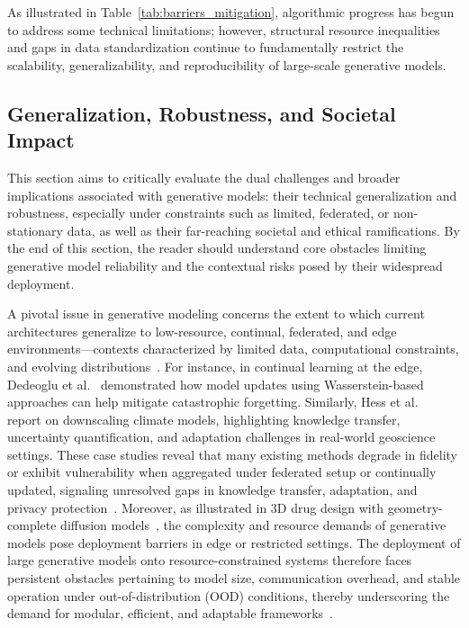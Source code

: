 \documentclass[sigconf]{acmart}
\begin{document}
As illustrated in Table~\ref{tab:barriers_mitigation}, algorithmic progress has begun to address some technical limitations; however, structural resource inequalities and gaps in data standardization continue to fundamentally restrict the scalability, generalizability, and reproducibility of large-scale generative models.

\subsection{Generalization, Robustness, and Societal Impact}

This section aims to critically evaluate the dual challenges and broader implications associated with generative models: their technical generalization and robustness, especially under constraints such as limited, federated, or non-stationary data, as well as their far-reaching societal and ethical ramifications. By the end of this section, the reader should understand core obstacles limiting generative model reliability and the contextual risks posed by their widespread deployment.

A pivotal issue in generative modeling concerns the extent to which current architectures generalize to low-resource, continual, federated, and edge environments—contexts characterized by limited data, computational constraints, and evolving distributions~\cite{ref72,ref73}. For instance, in continual learning at the edge, Dedeoglu et al.~\cite{ref72} demonstrated how model updates using Wasserstein-based approaches can help mitigate catastrophic forgetting. Similarly, Hess et al.~\cite{ref73} report on downscaling climate models, highlighting knowledge transfer, uncertainty quantification, and adaptation challenges in real-world geoscience settings. These case studies reveal that many existing methods degrade in fidelity or exhibit vulnerability when aggregated under federated setup or continually updated, signaling unresolved gaps in knowledge transfer, adaptation, and privacy protection~\cite{ref73}. Moreover, as illustrated in 3D drug design with geometry-complete diffusion models~\cite{ref74}, the complexity and resource demands of generative models pose deployment barriers in edge or restricted settings. The deployment of large generative models onto resource-constrained systems therefore faces persistent obstacles pertaining to model size, communication overhead, and stable operation under out-of-distribution (OOD) conditions, thereby underscoring the demand for modular, efficient, and adaptable frameworks~\cite{ref73,ref74,ref88}.
\end{document}
